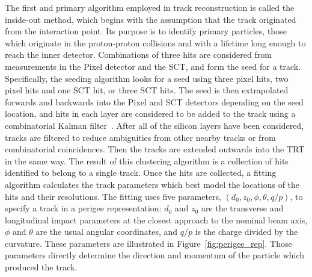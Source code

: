 The first and primary algorithm employed in track reconstruction is called the inside-out method, which begins with the assumption that the track originated from the interaction point.
Its purpose is to identify primary particles, those which originate in the proton-proton collisions and with a lifetime long enough to reach the inner detector.
Combinations of three hits are considered from measurements in the Pixel detector and the \ac{SCT}, and form the seed for a track. 
Specifically, the seeding algorithm looks for a seed using three pixel hits, two pixel hits and one \ac{SCT} hit, or three \ac{SCT} hits.
The seed is then extrapolated forwards and backwards into the Pixel and \ac{SCT} detectors depending on the seed location, and hits in each layer are considered to be added to the track using a combinatorial Kalman filter~\cite{ATLAS-CONF-2012-042}.
After all of the silicon layers have been considered, tracks are filtered to reduce ambiguities from other nearby tracks or from combinatorial coincidences.
Then the tracks are extended outwards into the \ac{TRT} in the same way.
The result of this clustering algorithm is a collection of hits identified to belong to a single track.
Once the hits are collected, a fitting algorithm calculates the track parameters which best model the locations of the hits and their resolutions.
The fitting uses five parameters, $(d_0, z_0, \phi, \theta, q/p)$, to specify a track in a perigee representation: $d_0$ and $z_0$ are the transverse and longitudinal impact parameters at the closest approach to the nominal beam axis, $\phi$ and $\theta$ are the usual angular coordinates, and $q/p$ is the charge divided by the curvature.
These parameters are illustrated in Figure~\ref{fig:perigee_rep}.
Those parameters directly determine the direction and momentum of the particle which produced the track.

